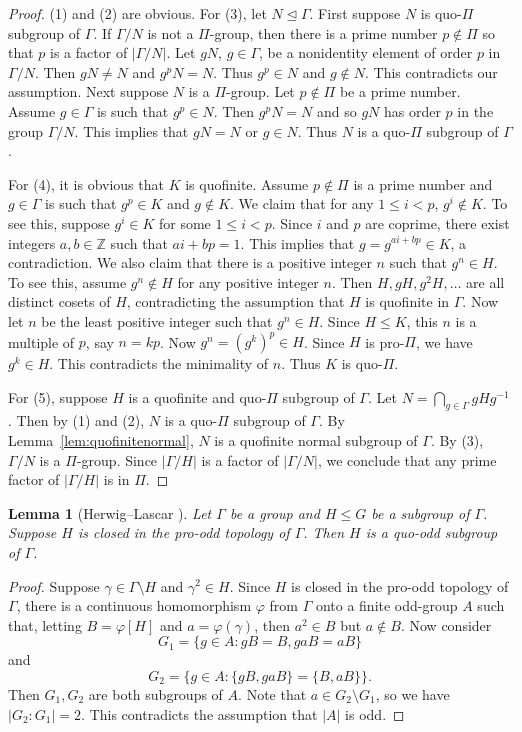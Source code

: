 \documentclass[11pt]{amsart}
\newtheorem{lemma}[theorem]{Lemma}
\theoremstyle{definition}
\theoremstyle{definition}
\numberwithin{equation}{section}
\begin{document}
\begin{proof} (1) and (2) are obvious. For (3), let $N\unlhd\Gamma$. First suppose $N$ is quo-$\Pi$ subgroup of $\Gamma$. If $\Gamma/N$ is not a $\Pi$-group, then there is a prime number $p\not\in \Pi$ so that $p$ is a factor of $|\Gamma/N|$. Let $gN$, $g\in \Gamma$, be a nonidentity element of order $p$ in $\Gamma/N$. Then $gN\neq N$ and $g^pN=N$. Thus $g^p\in N$ and $g\not\in N$. This contradicts our assumption. Next suppose $N$ is a $\Pi$-group. Let $p\not\in \Pi$ be a prime number. Assume $g\in \Gamma$ is such that $g^p\in N$. Then $g^pN=N$ and so $gN$ has order $p$ in the group $\Gamma/N$. This implies that $gN=N$ or $g\in N$. Thus $N$ is a quo-$\Pi$ subgroup of $\Gamma$. 

For (4), it is obvious that $K$ is quofinite. Assume $p\not\in \Pi$ is a prime number and $g\in \Gamma$ is such that $g^p\in K$ and $g\not\in K$. We claim that for any $1\leq i<p$, $g^i\not\in K$. To see this, suppose $g^i\in K$ for some $1\leq i<p$. Since $i$ and $p$ are coprime, there exist integers $a, b\in \mathbb{Z}$ such that $ai+bp=1$. This implies that $g=g^{ai+bp}\in K$, a contradiction. We also claim that there is a positive integer $n$ such that $g^n\in H$. To see this, assume $g^n\not\in H$ for any positive integer $n$. Then $H, gH, g^2H, \dots$ are all distinct cosets of $H$, contradicting the assumption that $H$ is quofinite in $\Gamma$. Now let $n$ be the least positive integer such that $g^n\in H$. Since $H\leq K$, this $n$ is a multiple of $p$, say $n=kp$. Now  $g^n=(g^k)^p\in H$. Since $H$ is pro-$\Pi$, we have $g^k\in H$. This contradicts the minimality of $n$. Thus $K$ is quo-$\Pi$.


For (5), suppose $H$ is a quofinite and quo-$\Pi$ subgroup of $\Gamma$. Let $N=\bigcap_{g\in \Gamma}gHg^{-1}$. Then by (1) and (2), $N$ is a quo-$\Pi$ subgroup of $\Gamma$. By Lemma~\ref{lem:quofinitenormal}, $N$ is a quofinite normal subgroup of $\Gamma$. By (3), $\Gamma/N$ is a $\Pi$-group. Since $|\Gamma/H|$ is a factor of $|\Gamma/N|$, we conclude that any prime factor of $|\Gamma/H|$ is in $\Pi$.
\end{proof}


\begin{lemma}[Herwig--Lascar \cite{HL00}] Let $\Gamma$ be a group and $H\leq G$ be a subgroup of $\Gamma$. Suppose $H$ is closed in the pro-odd topology of $\Gamma$. Then $H$ is a quo-odd subgroup of $\Gamma$.
\end{lemma}

\begin{proof} Suppose $\gamma\in \Gamma\setminus H$ and $\gamma^2\in H$. Since $H$ is closed in the pro-odd topology of $\Gamma$, there is a continuous homomorphism $\varphi$ from $\Gamma$ onto a finite odd-group $A$ such that, letting $B=\varphi[H]$ and $a=\varphi(\gamma)$, then $a^2\in B$ but $a\not\in B$. Now consider
$$ G_1=\{g\in A\colon gB=B, gaB=aB\} $$
and
$$ G_2=\{g\in A\colon \{gB, gaB\}=\{B, aB\}\}. $$
Then $G_1, G_2$ are both subgroups of $A$. Note that $a\in G_2\setminus G_1$, so we have $|G_2\colon G_1|=2$. This contradicts the assumption that $|A|$ is odd.
\end{proof}
\end{document}
